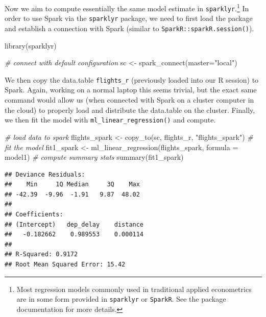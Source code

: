 \documentclass[
  12pt,
]{style/krantz}
\newenvironment{Shaded}{\begin{snugshade}}{\end{snugshade}}
\newcommand{\AttributeTok}[1]{\textcolor[rgb]{0.77,0.63,0.00}{#1}}
\newcommand{\CommentTok}[1]{\textcolor[rgb]{0.56,0.35,0.01}{\textit{#1}}}
\newcommand{\FunctionTok}[1]{\textcolor[rgb]{0.00,0.00,0.00}{#1}}
\newcommand{\NormalTok}[1]{#1}
\newcommand{\OtherTok}[1]{\textcolor[rgb]{0.56,0.35,0.01}{#1}}
\newcommand{\StringTok}[1]{\textcolor[rgb]{0.31,0.60,0.02}{#1}}
\begin{document}
Now we aim to compute essentially the same model estimate in \texttt{sparklyr}.\footnote{Most regression models commonly used in traditional applied econometrics are in some form provided in \texttt{sparklyr} or \texttt{SparkR}. See the package documentation for more details.} In order to use Spark via the \texttt{sparklyr} package, we need to first load the package and establish a connection with Spark (similar to \texttt{SparkR::sparkR.session()}).

\begin{Shaded}
\begin{Highlighting}[]
\FunctionTok{library}\NormalTok{(sparklyr)}

\CommentTok{\# connect with default configuration}
\NormalTok{sc }\OtherTok{\textless{}{-}} \FunctionTok{spark\_connect}\NormalTok{(}\AttributeTok{master=}\StringTok{"local"}\NormalTok{)}
\end{Highlighting}
\end{Shaded}

We then copy the data.table \texttt{flights\_r} (previously loaded into our R session) to Spark. Again, working on a normal laptop this seems trivial, but the exact same command would allow us (when connected with Spark on a cluster computer in the cloud) to properly load and distribute the data.table on the cluster. Finally, we then fit the model with \texttt{ml\_linear\_regression()} and compute.

\begin{Shaded}
\begin{Highlighting}[]
\CommentTok{\# load data to spark}
\NormalTok{flights\_spark }\OtherTok{\textless{}{-}} \FunctionTok{copy\_to}\NormalTok{(sc, flights\_r, }\StringTok{"flights\_spark"}\NormalTok{)}
\CommentTok{\# fit the model}
\NormalTok{fit1\_spark }\OtherTok{\textless{}{-}} \FunctionTok{ml\_linear\_regression}\NormalTok{(flights\_spark, }\AttributeTok{formula =}\NormalTok{ model1)}
\CommentTok{\# compute summary stats}
\FunctionTok{summary}\NormalTok{(fit1\_spark)}
\end{Highlighting}
\end{Shaded}

\begin{verbatim}
## Deviance Residuals:
##    Min     1Q Median     3Q    Max 
## -42.39  -9.96  -1.91   9.87  48.02 
## 
## Coefficients:
## (Intercept)   dep_delay    distance 
##   -0.182662    0.989553    0.000114 
## 
## R-Squared: 0.9172
## Root Mean Squared Error: 15.42
\end{verbatim}
\end{document}

